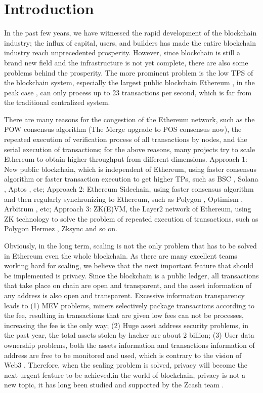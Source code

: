 \section{Introduction}\label{sec:introduction}

In the past few years, we have witnessed the rapid development of the blockchain industry; the influx of capital, users, and builders has made the entire blockchain industry reach unprecedented prosperity. However, since blockchain is still a brand new field and the infrastructure is not yet complete, there are also some problems behind the prosperity. The more prominent problem is the low TPS of the blockchain system, especially the largest public blockchain Ethereum \cite{website:Ethereum}, in the peak case \cite{website:Etherscan-chart}, can only process up to 23 transactions per second, which is far from the traditional centralized system. 

There are many reasons for the congestion of the Ethereum network, such as the POW \cite{website:POW} consensus algorithm (The Merge upgrade \cite{website:The-Merge} to POS \cite{website:POS} consensus now), the repeated execution of verification process of all transactions by nodes, and the serial execution of transactions; for the above reasons, many projects try to scale Ethereum to obtain higher throughput from different dimensions. Approach 1: New public blockchain, which is independent of Ethereum, using faster consensus algorithm or faster transaction execution to get higher TPs, such as BSC \cite{website:BSC}, Solana \cite{website:Solana}, Aptos \cite{website:Aptos}, etc; Approach 2: Ethereum Sidechain, using faster consensus algorithm and then regularly synchronizing to Ethereum, such as Polygon \cite{website:Polygon}, Optimism \cite{website:Optimism}, Arbitrum \cite{website:Arbitrum}, etc; Approach 3: ZK(E)VM, the Layer2 network of Ethereum, using ZK technology to solve the problem of repeated execution of transactions, such as Polygon Hermez \cite{website:Polygon-Hermez}, Zksync \cite{website:Zksync} and so on.

Obviously, in the long term, scaling is not the only problem that has to be solved in Ethereum even the whole blockchain. As there are many excellent teams working hard for scaling, we believe that the next important feature that should be implemented is privacy. Since the blockchain is a public ledger, all transactions that take place on chain are open and transparent, and the asset information of any address is also open and transparent. Excessive information transparency leads to (1) MEV problems, miners selectively package transactions according to the fee, resulting in transactions that are given low fees can not be processes, increasing the fee is the only way; (2) Huge asset address security problems, in the past year, the total assets stolen by hacher are about 2 billion; (3) User data ownership problems, both the assets information and transactions information of address are free to be monitored and used, which is contrary to the vision of Web3 \cite{website:Web3}. Therefore, when the scaling problem is solved, privacy will become the next urgent feature to be achieved.in the world of blockchain, privacy is not a new topic, it has long been studied and supported by the Zcash team \cite{website:Zcash}.





